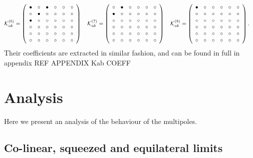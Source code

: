 \begin{align}
\\ \mathcal{K}^{(6)}_{ab}&= 
 \left( \begin {array}{cccccc} \bullet &\circ &\bullet &\circ 
&\circ &\circ \\  \circ &\bullet &\circ &
\circ &\circ &\circ \\  \bullet &\circ &
\circ &\circ &\circ &\circ \\  \circ &
\circ &\circ &\circ &\circ &\circ \\  
\circ &\circ &\circ &\circ &\circ &\circ 
\\  \circ &\circ &\circ &\circ &\circ &
\circ \end {array} \right) 
~~~ \mathcal{K}^{(7)}_{ab}= 
 \left( \begin {array}{cccccc} \circ &\bullet &\circ &\circ &
\circ &\circ \\  \bullet &\circ &\circ &
\circ &\circ &\circ \\  \circ &\circ &
\circ &\circ &\circ &\circ \\  \circ &
\circ &\circ &\circ &\circ &\circ \\  
\circ &\circ &\circ &\circ &\circ &\circ 
\\  \circ &\circ &\circ &\circ &\circ &
\circ \end {array} \right) 
~~~ \mathcal{K}^{(8)}_{ab}= 
 \left( \begin {array}{cccccc} \bullet &\circ &\circ &\circ &
\circ &\circ \\  \circ &\circ &\circ &
\circ &\circ &\circ \\  \circ &\circ &
\circ &\circ &\circ &\circ \\  \circ &
\circ &\circ &\circ &\circ &\circ \\  
\circ &\circ &\circ &\circ &\circ &\circ 
\\  \circ &\circ &\circ &\circ &\circ &
\circ \end {array} \right).
\end{align}
Their coefficients are extracted in similar fashion, and can be found in full in appendix  REF APPENDIX Kab COEFF%



\section{Analysis}\label{sec:anal}

Here we present an analysis of the behaviour of the  multipoles. 

\subsection*{ Co-linear, squeezed and equilateral limits}


